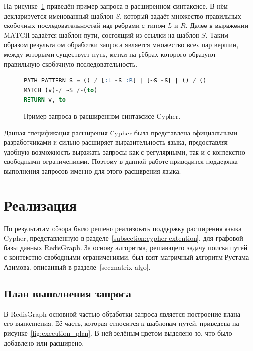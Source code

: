 На рисунке~\ref{code:cypher_query_3} приведён пример запроса в расширенном синтаксисе. В нём декларируется именованный шаблон $S$, который задаёт множество правильных скобочных последовательностей над ребрами с типом $L$ и $R$. Далее в выражении MATCH задаётся шаблон пути, состоящий из ссылки на шаблон $S$. Таким образом результатом обработки запроса является множество всех пар вершин, между которыми существует путь, метки на рёбрах которого образуют правильную скобочную последовательность. 



\begin{figure}[h!]
\begin{lstlisting}[language=sql]
PATH PATTERN S = ()-/ [:L ~S :R] | [~S ~S] | () /-()
MATCH (v)-/ ~S /-(to)
RETURN v, to
\end{lstlisting}
\caption{Пример запроса в расширенном синтаксисе Cypher.}
\label{code:cypher_query_3}
\end{figure}

Данная спецификация расширения Cypher была представлена официальными разработчиками и сильно расширяет выразительность языка, предоставляя удобную возможность выражать запросы как с регулярными, так и с контекстно-свободными ограничениями. Поэтому в данной работе приводится поддержка выполнения запросов именно для этого расширения языка.


\section{Реализация}
По результатам обзора было решено реализовать поддержку расширения языка Cypher, представленную в разделе~\ref{subsection:cypher-extention}, для графовой базы данных RedisGraph. За основу алгоритма, решающего задачу поиска путей с контекстно-свободными ограничениями, был взят матричный алгоритм Рустама Азимова, описанный в разделе~\ref{sec:matrix-algo}.


\subsection{План выполнения запроса}\label{execution-plan}
В RedisGraph основной частью обработки запроса является построение плана его выполнения. Её часть, которая относится к шаблонам путей, приведена на рисунке~\ref{fig:execution_plan}. В ней зелёным цветом выделено то, что было добавлено или расширено.

